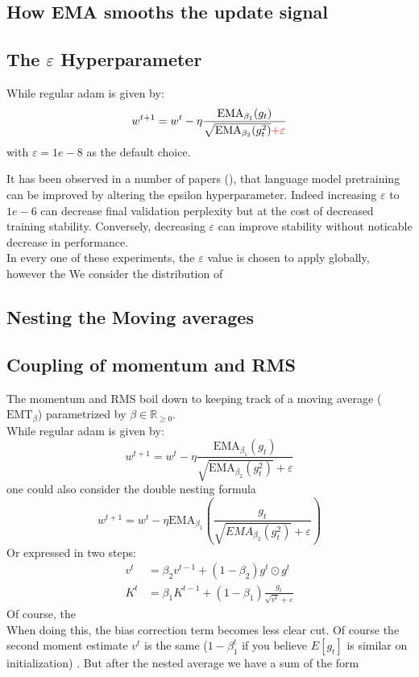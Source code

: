 \documentclass[12pt]{book}
\newcommand{\R}{\mathbb{R}}
\begin{document}
\subsection{How EMA smooths the update signal}
\subsection{The $\varepsilon $ Hyperparameter}
While regular adam is given by:
\[
	w^{t+1} = w^{t} - \eta \frac{\text{EMA}_{\beta_1}(g_t)}{\sqrt{\text{EMA}_{\beta_2}(g_t ^2) } \color{red}{+ \varepsilon  }}
\] 
with $\varepsilon = 1e-8$ as the default choice. 

It has been observed in a number of papers (\cite{yuan2020eadamoptimizerepsilonimpact}), that language model pretraining can be improved by altering the epsilon hyperparameter. Indeed increasing $\varepsilon $ to $1e-6$ can decrease final validation perplexity but at the cost of decreased training stability. Conversely, decreasing  $\varepsilon $ can improve stability without noticable decrease in performance. \\
In every one of these experiments, the $\varepsilon $ value is chosen to apply globally, however the 
We consider the distribution of 
\subsection{Nesting the Moving averages}
\subsection*{Coupling of momentum and RMS}
The momentum and RMS boil down to keeping track of a moving average ($\text{EMT}_{\beta}$) parametrized by $\beta\in \R_{\ge 0}$. 
\\
While regular adam is given by:
\[
w^{t+1} = w^{t} - \eta \frac{\text{EMA}_{\beta_1}(g_t)}{\sqrt{\text{EMA}_{\beta_2}(g_t ^2) } + \varepsilon  }
\] 
one could also consider the double nesting formula
\[
w^{t+1} = w^{t} - \eta \text{EMA}_{\beta_1} \left( \frac{g_t}{\sqrt{EMA_{\beta_2}(g_t^2)} + \varepsilon  } \right) 
\] 
Or expressed in two steps:
\begin{align*}
	v^{t} &= \beta_2v^{t-1} + (1-\beta_2)g^{t}\odot g^{t}\\
	K^{t} &= \beta_1K^{t-1} + (1-\beta_1) \frac{g_{t}}{\sqrt{v^{t}} + \varepsilon  }
\end{align*}
Of course, the \\
When doing this, the bias correction term becomes less clear cut. Of course the second moment estimate $v^{t}$ is the same ($1-\beta_1^{t} $ if you believe $E[g_t]$ is similar on initialization) . But after the nested average we have a sum of the form 
\end{document}
